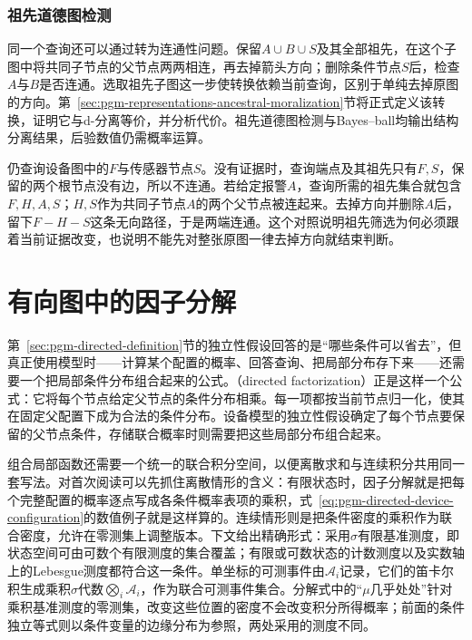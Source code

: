\subsubsection{祖先道德图检测}
\label{sec:pgm-directed-ancestral-moral-test}
\label{sec:pgm-directed-undirected-test}

同一个查询还可以通过转为连通性问题。保留$A\cup B\cup S$及其全部祖先，在这个子图中将共同子节点的父节点两两相连，再去掉箭头方向；删除条件节点$S$后，检查$A$与$B$是否连通。选取祖先子图这一步使转换依赖当前查询，区别于单纯去掉原图的方向。第~\ref{sec:pgm-representations-ancestral-moralization}节将正式定义该转换，证明它与d-分离等价，并分析代价。祖先道德图检测与Bayes--ball均输出结构分离结果，后验数值仍需概率运算。

仍查询设备图中的$F$与传感器节点$S$。没有证据时，查询端点及其祖先只有$F,S$，保留的两个根节点没有边，所以不连通。若给定报警$A$，查询所需的祖先集合就包含$F,H,A,S$；$H,S$作为共同子节点$A$的两个父节点被连起来。去掉方向并删除$A$后，留下$F-H-S$这条无向路径，于是两端连通。这个对照说明祖先筛选为何必须跟着当前证据改变，也说明不能先对整张原图一律去掉方向就结束判断。

\endgroup

\section{有向图中的因子分解}
\label{sec:pgm-directed-factorization}

\enlargethispage{2\baselineskip}
第~\ref{sec:pgm-directed-definition}节的独立性假设回答的是“哪些条件可以省去”，但真正使用模型时——计算某个配置的概率、回答查询、把局部分布存下来——还需要一个把局部条件分布组合起来的公式。（directed factorization）正是这样一个公式：它将每个节点给定父节点的条件分布相乘。每一项都按当前节点归一化，使其在固定父配置下成为合法的条件分布。设备模型的独立性假设确定了每个节点要保留的父节点条件，存储联合概率时则需要把这些局部分布组合起来。

组合局部函数还需要一个统一的联合积分空间，以便离散求和与连续积分共用同一套写法。对首次阅读可以先抓住离散情形的含义：有限状态时，因子分解就是把每个完整配置的概率逐点写成各条件概率表项的乘积，式~\eqref{eq:pgm-directed-device-configuration}的数值例子就是这样算的。连续情形则是把条件密度的乘积作为联合密度，允许在零测集上调整版本。下文给出精确形式：采用$\sigma$有限基准测度，即状态空间可由可数个有限测度的集合覆盖；有限或可数状态的计数测度以及实数轴上的Lebesgue测度都符合这一条件。单坐标的可测事件由$\mathcal A_i$记录，它们的笛卡尔积生成乘积$\sigma$代数$\bigotimes_i\mathcal A_i$，作为联合可测事件集合。分解式中的“$\mu$几乎处处”针对乘积基准测度的零测集，改变这些位置的密度不会改变积分所得概率；前面的条件独立等式则以条件变量的边缘分布为参照，两处采用的测度不同。

